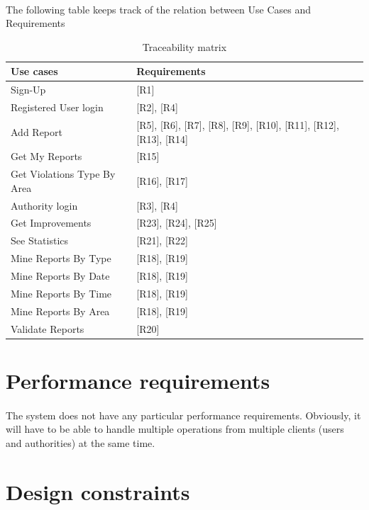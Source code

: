 				\paragraph{}
					The following table keeps track of the relation between Use Cases and Requirements
				\begin{table}[!h]
					\centering
					\begin{tabular}{lL{0.55\textwidth}}
						\toprule
							\textbf{Use cases} & \textbf{Requirements} \\
						\midrule
							Sign-Up & {[R1]} \\
							Registered User login & {[R2]}, {[R4]} \\
							Add Report & {[R5]}, {[R6]}, {[R7]}, {[R8]}, {[R9]}, {[R10]}, {[R11]}, {[R12]}, {[R13]}, {[R14]} \\
							Get My Reports & {[R15]} \\
							Get Violations Type By Area & {[R16]}, {[R17]} \\
							Authority login & {[R3]}, {[R4]} \\
							Get Improvements & {[R23]}, {[R24]}, {[R25]} \\
							See Statistics & {[R21]}, {[R22]} \\
							Mine Reports By Type & {[R18]}, {[R19]} \\
							Mine Reports By Date & {[R18]}, {[R19]} \\
							Mine Reports By Time & {[R18]}, {[R19]} \\
							Mine Reports By Area & {[R18]}, {[R19]} \\
							Validate Reports & {[R20]} \\
						\bottomrule
					\end{tabular}
					\caption{Traceability matrix}
				\end{table}
		\section{Performance requirements}
			\paragraph{}
				The system does not have any particular performance requirements. Obviously, it will have to be able to handle multiple operations from multiple clients (users and authorities) at the same time.
		\section{Design constraints}
